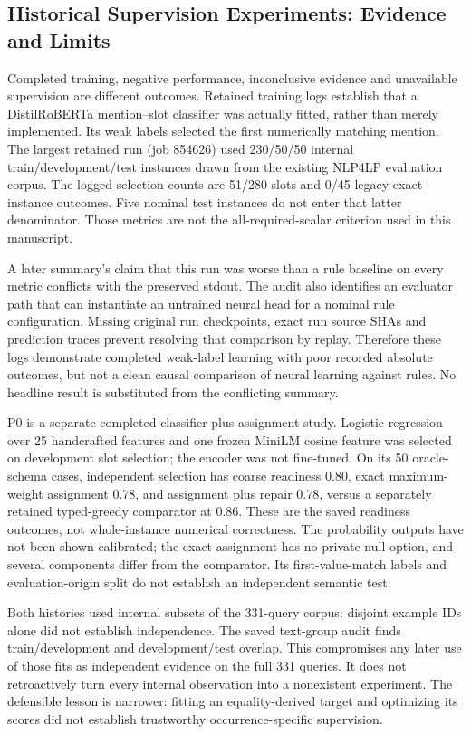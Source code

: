 \subsection{Historical Supervision Experiments: Evidence and Limits}
\label{app:supervision-audit}

Completed training, negative performance, inconclusive evidence and unavailable supervision are different outcomes. Retained training logs establish that a DistilRoBERTa mention--slot classifier was actually fitted, rather than merely implemented. Its weak labels selected the first numerically matching mention. The largest retained run (job 854626) used 230/50/50 internal train/development/test instances drawn from the existing NLP4LP evaluation corpus. The logged selection counts are 51/280 slots and 0/45 legacy exact-instance outcomes. Five nominal test instances do not enter that latter denominator. Those metrics are not the all-required-scalar criterion used in this manuscript.

A later summary's claim that this run was worse than a rule baseline on every metric conflicts with the preserved stdout. The audit also identifies an evaluator path that can instantiate an untrained neural head for a nominal rule configuration. Missing original run checkpoints, exact run source SHAs and prediction traces prevent resolving that comparison by replay. Therefore these logs demonstrate completed weak-label learning with poor recorded absolute outcomes, but not a clean causal comparison of neural learning against rules. No headline result is substituted from the conflicting summary.

P0 is a separate completed classifier-plus-assignment study. Logistic regression over 25 handcrafted features and one frozen MiniLM cosine feature was selected on development slot selection; the encoder was not fine-tuned. On its 50 oracle-schema cases, independent selection has coarse readiness 0.80, exact maximum-weight assignment 0.78, and assignment plus repair 0.78, versus a separately retained typed-greedy comparator at 0.86. These are the saved readiness outcomes, not whole-instance numerical correctness. The probability outputs have not been shown calibrated; the exact assignment has no private null option, and several components differ from the comparator. Its first-value-match labels and evaluation-origin split do not establish an independent semantic test.

Both histories used internal subsets of the 331-query corpus; disjoint example IDs alone did not establish independence. The saved text-group audit finds train/development and development/test overlap. This compromises any later use of those fits as independent evidence on the full 331 queries. It does not retroactively turn every internal observation into a nonexistent experiment. The defensible lesson is narrower: fitting an equality-derived target and optimizing its scores did not establish trustworthy occurrence-specific supervision.

